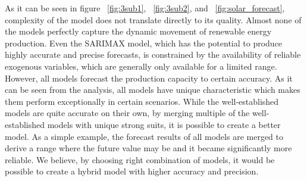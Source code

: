 \documentclass[acmtog]{acmart}
\begin{document}
As it can be seen in figure ~\ref{fig:3sub1}, ~\ref{fig:3sub2}, and ~\ref{fig:solar_forecast}, complexity of the model does not translate directly to its quality. Almost none of the models perfectly capture the dynamic movement of renewable energy production. Even the SARIMAX model, which has the potential to produce highly accurate and precise forecasts, is constrained by the availability of reliable exogenous variables, which are generally only available for a limited range. However, all models forecast the production capacity to certain accuracy. As it can be seen from the analysis, all models have unique characteristic which makes them perform exceptionally in certain scenarios. While the well-established models are quite accurate on their own, by merging multiple of the well-established models with unique strong suits, it is possible to create a better model. As a simple example, the forecast results of all models are merged to derive a range where the future value may be and it became significantly more reliable. We believe, by choosing right combination of models, it would be possible to create a hybrid model with higher accuracy and precision.
\end{document}

